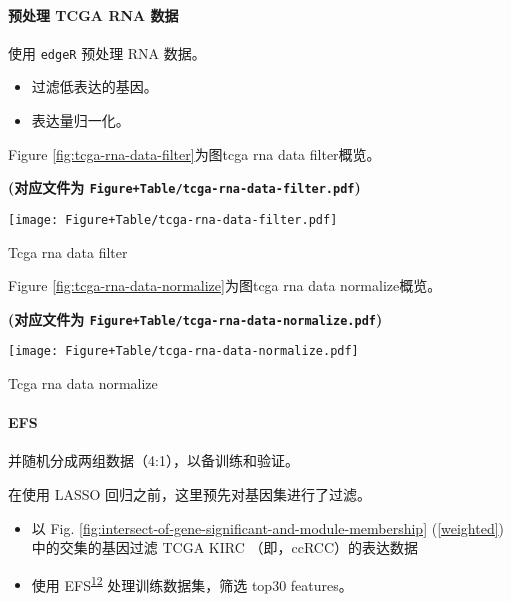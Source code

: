 \documentclass[
]{article}
\providecommand{\tightlist}{%
  \setlength{\itemsep}{0pt}\setlength{\parskip}{0pt}}
\begin{document}
\hypertarget{ux9884ux5904ux7406-tcga-rna-ux6570ux636e}{%
\paragraph{预处理 TCGA RNA 数据}\label{ux9884ux5904ux7406-tcga-rna-ux6570ux636e}}

使用 \texttt{edgeR} 预处理 RNA 数据。

\begin{itemize}
\tightlist
\item
  过滤低表达的基因。
\item
  表达量归一化。
\end{itemize}

Figure \ref{fig:tcga-rna-data-filter}为图tcga rna data filter概览。

\textbf{(对应文件为 \texttt{Figure+Table/tcga-rna-data-filter.pdf})}

\def\@captype{figure}
\begin{center}
\texttt{[image: Figure+Table/tcga-rna-data-filter.pdf]}
\caption{Tcga rna data filter}\label{fig:tcga-rna-data-filter}
\end{center}

Figure \ref{fig:tcga-rna-data-normalize}为图tcga rna data normalize概览。

\textbf{(对应文件为 \texttt{Figure+Table/tcga-rna-data-normalize.pdf})}

\def\@captype{figure}
\begin{center}
\texttt{[image: Figure+Table/tcga-rna-data-normalize.pdf]}
\caption{Tcga rna data normalize}\label{fig:tcga-rna-data-normalize}
\end{center}

\hypertarget{efs}{%
\paragraph{EFS}\label{efs}}

并随机分成两组数据（4:1），以备训练和验证。

在使用 LASSO 回归之前，这里预先对基因集进行了过滤。

\begin{itemize}
\tightlist
\item
  以 Fig. \ref{fig:intersect-of-gene-significant-and-module-membership} (\ref{weighted}) 中的交集的基因过滤 TCGA KIRC （即，ccRCC）的表达数据
\item
  使用 EFS\textsuperscript{\protect\hyperlink{ref-EfsAnEnsemblNeuman2017}{12}} 处理训练数据集，筛选 top30 features。
\end{itemize}
\end{document}
